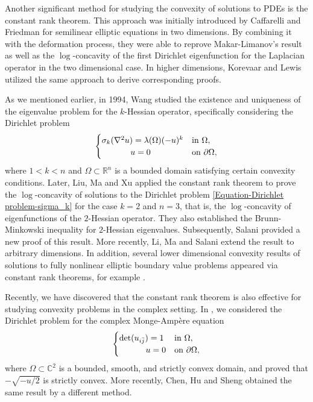 \documentclass[11pt]{amsart}
\numberwithin{theorem}{section}
\numberwithin{equation}{section}
\begin{document}
Another significant method for studying the convexity of solutions to PDEs is the constant rank theorem. This approach was initially introduced by Caffarelli and Friedman \cite{Caffarelli-Friedman1985} for semilinear elliptic equations in two dimensions. By combining it with the deformation process, they were able to reprove Makar-Limanov's result as well as the $\log$-concavity of the first Dirichlet eigenfunction for the Laplacian operator in the two dimensional case. In higher dimensions, Korevaar and Lewis \cite{Korevaar-Lewis1987} utilized the same approach to derive corresponding proofs.

As we mentioned earlier, in 1994, Wang \cite{Wang1994} studied the existence and uniqueness of the eigenvalue problem for the $k$-Hessian operator, specifically considering the Dirichlet problem
\begin{equation}\label{Equation-Dirichlet problem-sigma_k}
\begin{cases}
 \sigma_k(\nabla^2u)=\lambda(\Omega)(-u)^k & \mathrm{in} \ \Omega,\\
 \hspace{12mm}u=0 & \mathrm{on} \ \partial\Omega,
\end{cases}
\end{equation}
where $1<k<n$ and $\Omega\subset\mathbb{R}^n$ is a bounded domain satisfying certain convexity conditions. Later, Liu, Ma and Xu \cite{Liu-Ma-Xu2010} applied the constant rank theorem to prove the $\log$-concavity of solutions to the Dirichlet problem \eqref{Equation-Dirichlet problem-sigma_k} for the case $k=2$ and $n=3$, that is, the $\log$-concavity of eigenfunctions of the $2$-Hessian operator. They also established the Brunn-Minkowski inequality for $2$-Hessian eigenvalues. Subsequently, Salani \cite{Salani2012} provided a new proof of this result. More recently, Li, Ma and Salani \cite{Li-Ma-Salani2026} extend the result to arbitrary dimensions. In addition, several lower dimensional convexity results of solutions to fully nonlinear elliptic boundary value problems appeared via constant rank theorems, for example \cite{Huang2019,Zhang-Zhou2023,Chen-Jia-Xiong2025}.

Recently, we have discovered that the constant rank theorem is also effective for studying convexity problems in the complex setting. In \cite{Zhang-Zhou2025}, we considered the Dirichlet problem for the complex Monge-Amp\`{e}re equation
\[\begin{cases}
 \det(u_{i\bar{j}})=1 & \mathrm{in}\ \Omega,\\
 \hspace{1.1cm}u=0 & \mathrm{on}\ \partial\Omega,
\end{cases}\]
where $\Omega\subset\mathbb{C}^2$ is a bounded, smooth, and strictly convex domain, and proved that $-\sqrt{-u/2}$ is strictly convex. More recently, Chen, Hu and Sheng \cite{Chen-Hu-Sheng2026} obtained the same result by a different method. 
\end{document}
